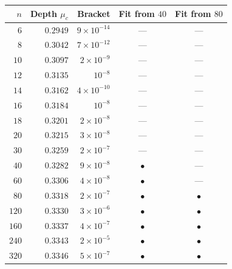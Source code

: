 \begin{tabular}{rrrcc}
\toprule
$n$ & Depth $\mu_c$ & Bracket & Fit from $40$ & Fit from $80$ \tabularnewline
\midrule
$6$ & $0.2949$ & $9\times10^{-14}$ & --- & --- \tabularnewline
$8$ & $0.3042$ & $7\times10^{-12}$ & --- & --- \tabularnewline
$10$ & $0.3097$ & $2\times10^{-9}$ & --- & --- \tabularnewline
$12$ & $0.3135$ & $10^{-8}$ & --- & --- \tabularnewline
$14$ & $0.3162$ & $4\times10^{-10}$ & --- & --- \tabularnewline
$16$ & $0.3184$ & $10^{-8}$ & --- & --- \tabularnewline
$18$ & $0.3201$ & $2\times10^{-8}$ & --- & --- \tabularnewline
$20$ & $0.3215$ & $3\times10^{-8}$ & --- & --- \tabularnewline
$30$ & $0.3259$ & $2\times10^{-7}$ & --- & --- \tabularnewline
$40$ & $0.3282$ & $9\times10^{-8}$ & $\bullet$ & --- \tabularnewline
$60$ & $0.3306$ & $4\times10^{-8}$ & $\bullet$ & --- \tabularnewline
$80$ & $0.3318$ & $2\times10^{-7}$ & $\bullet$ & $\bullet$ \tabularnewline
$120$ & $0.3330$ & $3\times10^{-6}$ & $\bullet$ & $\bullet$ \tabularnewline
$160$ & $0.3337$ & $4\times10^{-7}$ & $\bullet$ & $\bullet$ \tabularnewline
$240$ & $0.3343$ & $2\times10^{-5}$ & $\bullet$ & $\bullet$ \tabularnewline
$320$ & $0.3346$ & $5\times10^{-7}$ & $\bullet$ & $\bullet$ \tabularnewline
\bottomrule
\end{tabular}
